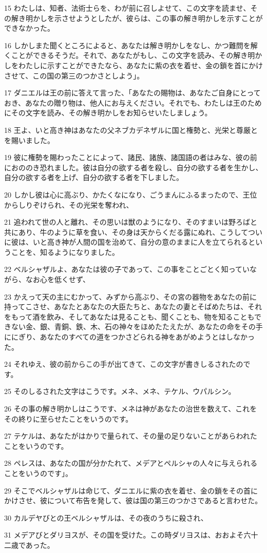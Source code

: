 \par 15 わたしは、知者、法術士らを、わが前に召しよせて、この文字を読ませ、その解き明かしを示させようとしたが、彼らは、この事の解き明かしを示すことができなかった。
\par 16 しかしまた聞くところによると、あなたは解き明かしをなし、かつ難問を解くことができるそうだ。それで、あなたがもし、この文字を読み、その解き明かしをわたしに示すことができたなら、あなたに紫の衣を着せ、金の鎖を首にかけさせて、この国の第三のつかさとしよう」。
\par 17 ダニエルは王の前に答えて言った、「あなたの賜物は、あなたご自身にとっておき、あなたの贈り物は、他人にお与えください。それでも、わたしは王のためにその文字を読み、その解き明かしをお知らせいたしましょう。
\par 18 王よ、いと高き神はあなたの父ネブカデネザルに国と権勢と、光栄と尊厳とを賜いました。
\par 19 彼に権勢を賜わったことによって、諸民、諸族、諸国語の者はみな、彼の前におののき恐れました。彼は自分の欲する者を殺し、自分の欲する者を生かし、自分の欲する者を上げ、自分の欲する者を下しました。
\par 20 しかし彼は心に高ぶり、かたくなになり、ごうまんにふるまったので、王位からしりぞけられ、その光栄を奪われ、
\par 21 追われて世の人と離れ、その思いは獣のようになり、そのすまいは野ろばと共にあり、牛のように草を食い、その身は天からくだる露にぬれ、こうしてついに彼は、いと高き神が人間の国を治めて、自分の意のままに人を立てられるということを、知るようになりました。
\par 22 ベルシャザルよ、あなたは彼の子であって、この事をことごとく知っていながら、なお心を低くせず、
\par 23 かえって天の主にむかって、みずから高ぶり、その宮の器物をあなたの前に持ってこさせ、あなたとあなたの大臣たちと、あなたの妻とそばめたちは、それをもって酒を飲み、そしてあなたは見ることも、聞くことも、物を知ることもできない金、銀、青銅、鉄、木、石の神々をほめたたえたが、あなたの命をその手ににぎり、あなたのすべての道をつかさどられる神をあがめようとはしなかった。
\par 24 それゆえ、彼の前からこの手が出てきて、この文字が書きしるされたのです。
\par 25 そのしるされた文字はこうです。メネ、メネ、テケル、ウパルシン。
\par 26 その事の解き明かしはこうです、メネは神があなたの治世を数えて、これをその終りに至らせたことをいうのです。
\par 27 テケルは、あなたがはかりで量られて、その量の足りないことがあらわれたことをいうのです。
\par 28 ペレスは、あなたの国が分かたれて、メデアとペルシャの人々に与えられることをいうのです」。
\par 29 そこでベルシャザルは命じて、ダニエルに紫の衣を着せ、金の鎖をその首にかけさせ、彼について布告を発して、彼は国の第三のつかさであると言わせた。
\par 30 カルデヤびとの王ベルシャザルは、その夜のうちに殺され、
\par 31 メデアびとダリヨスが、その国を受けた。この時ダリヨスは、おおよそ六十二歳であった。


